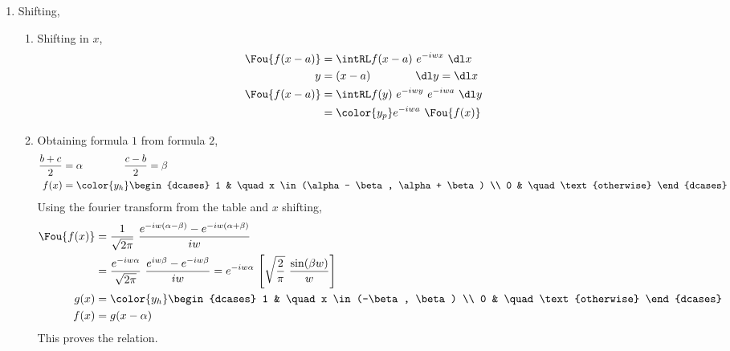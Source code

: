 \begin{enumerate}
    \item Shifting,
          \begin{enumerate}
              \item Shifting in $ x $,
                    \begin{align}
                        \Fou\{f(x-a)\} & = \intRL f(x-a)\ e^{-iwx}\ \dl x         \\
                        y              & = (x-a) \qquad\qquad \dl y = \dl x       \\
                        \Fou\{f(x-a)\} & = \intRL f(y)\ e^{-iwy}\ e^{-iwa}\ \dl y \\
                                       & = \color{y_p} e^{-iwa}\ \Fou\{f(x)\}
                    \end{align}

              \item Obtaining formula $ 1 $ from formula $ 2 $,
                    \begin{align}
                        \frac{b+c}{2} & = \alpha \qquad\qquad \frac{c-b}{2} = \beta \\
                        f(x)          & = \color{y_h}
                        \begin{dcases}
                            1 & \quad x \in (\alpha - \beta, \alpha + \beta) \\
                            0 & \quad \text{otherwise}
                        \end{dcases}
                    \end{align}
                    Using the fourier transform from the table and $ x $ shifting,
                    \begin{align}
                        \Fou\{f(x)\} & = \frac{1}{\sqrt{2\pi}}
                        \ \frac{e^{-iw(\alpha - \beta)} - e^{-iw(\alpha + \beta)}}
                        {iw}                                                \\
                                     & =  \frac{e^{-iw\alpha}}{\sqrt{2\pi}}
                        \ \frac{e^{iw\beta} - e^{-iw\beta}}{iw}
                        = e^{-iw \alpha} \ \Bigg[ \sqrt{\frac{2}{\pi}}
                        \ \frac{\sin(\beta w)}{w} \Bigg]                    \\
                        g(x)         & = \color{y_h}
                        \begin{dcases}
                            1 & \quad x \in (-\beta, \beta) \\
                            0 & \quad \text{otherwise}
                        \end{dcases}                     \\
                        f(x)         & = g(x - \alpha)
                    \end{align}
                    This proves the relation.


\end{enumerate}
\end{enumerate}
